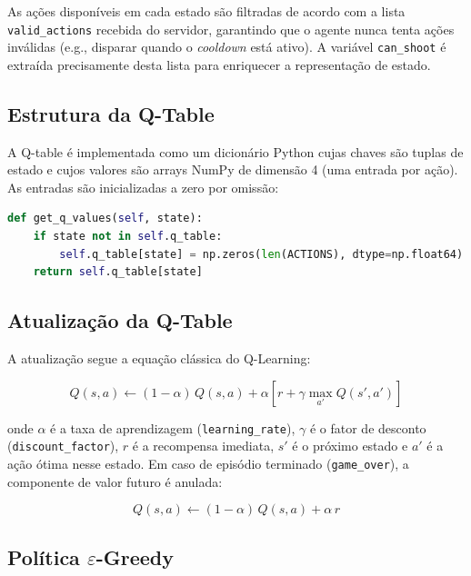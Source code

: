 \documentclass[12pt,a4paper]{article}
\begin{document}
As ações disponíveis em cada estado são filtradas de acordo com a lista \texttt{valid\_actions} recebida do servidor, garantindo que o agente nunca tenta ações inválidas (e.g., disparar quando o \textit{cooldown} está ativo). A variável \texttt{can\_shoot} é extraída precisamente desta lista para enriquecer a representação de estado.

\subsection{Estrutura da Q-Table}

A Q-table é implementada como um dicionário Python cujas chaves são tuplas de estado e cujos valores são arrays NumPy de dimensão 4 (uma entrada por ação). As entradas são inicializadas a zero por omissão:

\begin{lstlisting}[language=Python, caption={Inicialização preguiçosa da Q-table}]
def get_q_values(self, state):
    if state not in self.q_table:
        self.q_table[state] = np.zeros(len(ACTIONS), dtype=np.float64)
    return self.q_table[state]
\end{lstlisting}

\subsection{Atualização da Q-Table}

A atualização segue a equação clássica do Q-Learning:

\begin{equation}
    Q(s, a) \leftarrow (1 - \alpha)\,Q(s, a) + \alpha\left[r + \gamma \max_{a'} Q(s', a')\right]
    \label{eq:qlearning}
\end{equation}

onde $\alpha$ é a taxa de aprendizagem (\texttt{learning\_rate}), $\gamma$ é o fator de desconto (\texttt{discount\_factor}), $r$ é a recompensa imediata, $s'$ é o próximo estado e $a'$ é a ação ótima nesse estado. Em caso de episódio terminado (\texttt{game\_over}), a componente de valor futuro é anulada:

\begin{equation}
    Q(s, a) \leftarrow (1 - \alpha)\,Q(s, a) + \alpha\, r
\end{equation}

\subsection{Política $\varepsilon$-Greedy}
\end{document}
